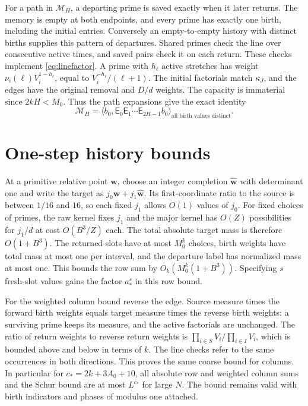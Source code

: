 \documentclass[11pt]{amsart}
\numberwithin{equation}{section}
\theoremstyle{remark}
\begin{document}
For a path in $\mathcal M_H$, a departing prime is saved exactly
when it later returns. The memory is empty at both endpoints, and
every prime has exactly one birth, including the initial entries.
Conversely an empty-to-empty history with distinct births supplies
this pattern of departures. Shared primes check the line over
consecutive active times, and saved pairs check it on each return.
These checks implement \eqref{eq:linefactor}. A prime with $h_\ell$
active stretches has weight $\nu_i(\ell)V_i^{1-h_\ell}$, equal to
$V_i^{-h_\ell}/(\ell+1)$. The initial factorials match $\kappa_J$,
and the edges have the original removal and $D/d$ weights. The
capacity is immaterial since $2kH<M_0$. Thus the path expansions
give the exact identity
\begin{equation}\label{eq:emptymemory}
 \mathcal M_H=
  \langle b_0,\mathsf E_0\mathsf E_1\cdots\mathsf E_{2H-1}b_0\rangle
    _{\text{all birth values distinct}}.
\end{equation}

\section{One-step history bounds}\label{sec:onestep}

At a primitive relative point $\mathbf w$, choose an integer
completion $\widehat{\mathbf w}$ with determinant one and write the
target as $j_0\mathbf w+j_1\widehat{\mathbf w}$. Its first-coordinate
ratio to the source is between $1/16$ and $16$, so each fixed $j_1$
allows $O(1)$ values of $j_0$. For fixed choices of primes, the raw
kernel fixes $j_1$ and the major kernel has $O(Z)$ possibilities
for $j_1/d$ at cost $O(B^3/Z)$ each. The total absolute target mass
is therefore $O(1+B^3)$. The returned slots have at most $M_0^k$
choices, birth weights have total mass at most one per interval,
and the departure label has normalized mass at most one. This bounds
the row sum by $O_k(M_0^k(1+B^3))$. Specifying $s$ fresh-slot values
gains the factor $a_*^s$ in this row bound.

For the weighted column bound reverse the edge. Source measure
times the forward birth weights equals target measure times the
reverse birth weights: a surviving prime keeps its measure, and
the active factorials are unchanged. The ratio of return weights
to reverse return weights is $\prod_{i\in S}V_i/\prod_{i\in I}V_i$,
which is bounded above and below in terms of $k$. The line checks
refer to the same occurrences in both directions. This proves the
same coarse bound for columns. In particular for
$c_*=2k+3A_0+10$, all absolute row and weighted column sums and the
Schur bound are at most $L^{c_*}$ for large $N$. The bound remains
valid with birth indicators and phases of modulus one attached.
\end{document}
